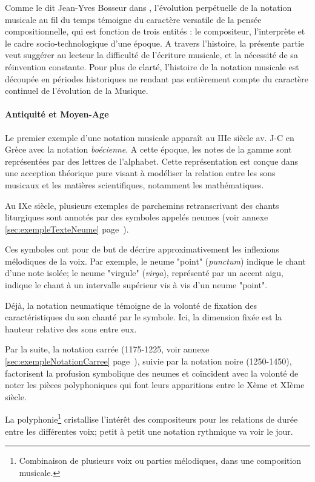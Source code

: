 Comme le dit Jean-Yves Bosseur dans \cite{bosseur2005}, l'évolution perpétuelle de la notation musicale au fil du temps témoigne du caractère versatile de la pensée compositionnelle, qui est fonction de trois entités : le compositeur, l'interprète et le cadre socio-technologique d'une époque.
A travers l'histoire, la présente partie veut suggérer au lecteur la difficulté de l'écriture musicale, et la nécessité de sa réinvention constante.
Pour plus de clarté, l'histoire de la notation musicale est découpée en périodes historiques ne rendant pas entièrement compte du caractère continuel de l'évolution de la Musique.   


\paragraph{Antiquité et Moyen-Age} Le premier exemple d'une notation musicale apparaît au IIIe siècle av. J-C en Grèce avec la notation \textit{boécienne}. A cette époque, les notes de la gamme sont représentées par des lettres de l'alphabet.
Cette représentation est conçue dans une acception théorique pure visant à modéliser la relation entre les sons musicaux et les matières scientifiques, notamment les mathématiques.

Au IXe siècle, plusieurs exemples de parchemins retranscrivant des chants liturgiques sont annotés par des symboles appelés \glspl{neume} (voir annexe \ref{sec:exempleTexteNeume} page~\pageref{sec:exempleTexteNeume}). 

Ces symboles ont pour de but de décrire approximativement les inflexions mélodiques de la voix. Par exemple, le neume "point" (\textit{punctum}) indique le chant d'une note isolée; le neume "virgule" (\textit{virga}), représenté par un accent aigu, indique le chant à un intervalle supérieur vis à vis d'un neume "point".

Déjà, la notation neumatique témoigne de la volonté de fixation des caractéristiques du son chanté par le symbole. Ici, la dimension fixée est la hauteur relative des sons entre eux.

Par la suite, la notation carrée (1175-1225, voir annexe \ref{sec:exempleNotationCarree} page~\pageref{sec:exempleNotationCarree}), suivie par la notation noire (1250-1450), factorisent la profusion symbolique des neumes et coïncident avec la volonté de noter les pièces polyphoniques qui font leurs apparitions entre le Xème et XIème siècle.

La \gls{polyphonie}\footnote{Combinaison de plusieurs voix ou parties mélodiques, dans une composition musicale.} cristallise l'intérêt des compositeurs pour les relations de durée entre les différentes voix; petit à petit une notation rythmique va voir le jour.

